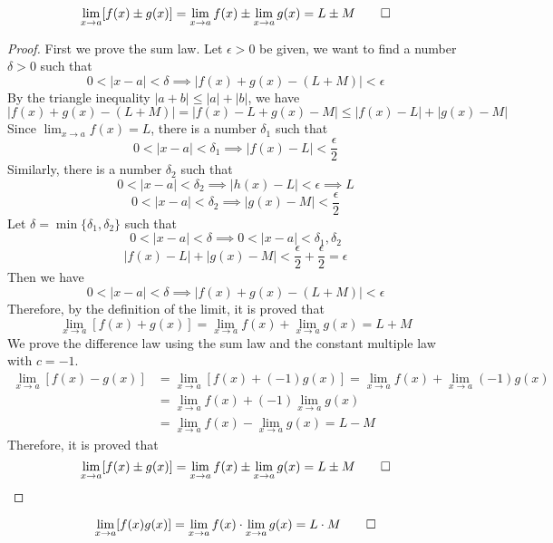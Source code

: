 \begin{theorem}
    \[\lim_{x\to a}[f(x)\pm g(x)]=\lim_{x\to a}f(x)\pm\lim_{x\to a}g(x)
    =L\pm M\qedhere\]
\end{theorem}
\begin{proof}
    First we prove the sum law.
    Let \(\epsilon>0\) be given, we want to find a number \(\delta>0\) such
    that
    \[0<|x-a|<\delta\implies|f(x)+g(x)-(L+M)|<\epsilon\]
    By the triangle inequality \(|a+b|\leq|a|+|b|\), we have
    \[|f(x)+g(x)-(L+M)|=|f(x)-L+g(x)-M|\leq|f(x)-L|+|g(x)-M|\]
    Since \(\lim_{x\to a}f(x)=L\), there is a number \(\delta_1\) such that
    \[0<|x-a|<\delta_1\implies|f(x)-L|<\frac{\epsilon}{2}\]
    Similarly, there is a number \(\delta_2\) such that
    \[0<|x-a|<\delta_2\implies|h(x)-L|<\epsilon\implies L\]
    \[0<|x-a|<\delta_2\implies|g(x)-M|<\frac{\epsilon}{2}\]
    Let \(\delta=\min\{\delta_1,\delta_2\}\) such that
    \[0<|x-a|<\delta\implies0<|x-a|<\delta_1,\delta_2\]
    \[|f(x)-L|+|g(x)-M|<\frac{\epsilon}{2}+\frac{\epsilon}{2}=\epsilon\]
    Then we have
    \[0<|x-a|<\delta\implies|f(x)+g(x)-(L+M)|<\epsilon\]
    Therefore, by the definition of the limit, it is proved that
    \[\lim_{x\to a}[f(x)+g(x)]=\lim_{x\to a}f(x)+\lim_{x\to a}g(x)=L+M\]
    We prove the difference law using the sum law and the constant multiple
    law with \(c=-1\).
    \begin{align*}
        \lim_{x\to a}[f(x)-g(x)]&=\lim_{x\to a}[f(x)+(-1)g(x)]
        =\lim_{x\to a}f(x)+\lim_{x\to a}(-1)g(x) \\
        &=\lim_{x\to a}f(x)+(-1)\lim_{x\to a}g(x) \\
        &=\lim_{x\to a}f(x)-\lim_{x\to a}g(x) = L-M
    \end{align*}
    Therefore, it is proved that
    \[\lim_{x\to a}[f(x)\pm g(x)]=\lim_{x\to a}f(x)\pm\lim_{x\to a}g(x)
    =L\pm M\qedhere\]
\end{proof}
\begin{theorem}
    \[\lim_{x\to a}[f(x)g(x)]=\lim_{x\to a}f(x)\cdot\lim_{x\to a}g(x)
    =L\cdot M\qedhere\]
\end{theorem}
